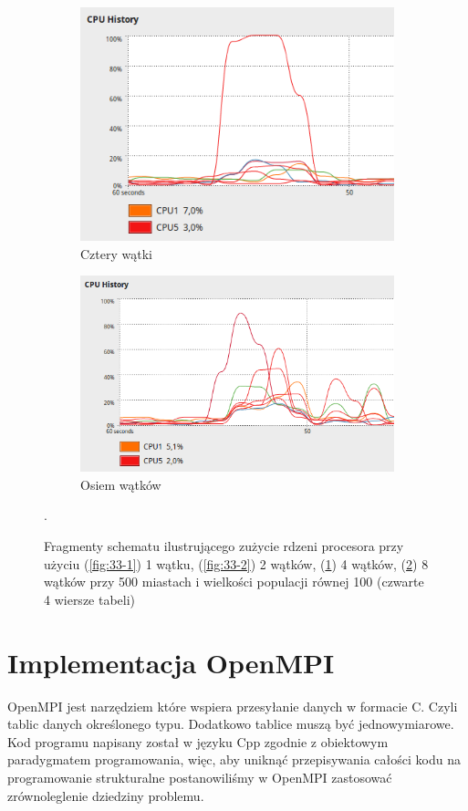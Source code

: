 \documentclass[10pt,a4paper]{article}
\begin{document}
\begin{figure}[H]
    \begin{subfigure}[b]{0.4\textwidth}
        \includegraphics[width=\textwidth]{33-4.png}
        \caption{Cztery wątki}
        \label{fig:33-4}
    \end{subfigure} 
    \begin{subfigure}[b]{0.4\textwidth}
            \includegraphics[width=\textwidth]{33-8.png}
            \caption{Osiem wątków}
            \label{fig:33-8}
    \end{subfigure}
    \caption{Fragmenty schematu ilustrującego zużycie rdzeni procesora przy użyciu (\ref{fig:33-1}) 1 wątku, (\ref{fig:33-2}) 2 wątków, (\ref{fig:33-4}) 4 wątków, (\ref{fig:33-8}) 8 wątków przy 500 miastach i wielkości populacji równej 100 (czwarte 4 wiersze tabeli)}\label{fig:33}. 
\end{figure}
\section{Implementacja OpenMPI}
 OpenMPI jest narzędziem które wspiera przesyłanie danych w formacie C. Czyli tablic danych określonego typu. Dodatkowo tablice muszą być jednowymiarowe. Kod programu napisany został w języku Cpp zgodnie z obiektowym paradygmatem programowania, więc, aby uniknąć przepisywania całości kodu na programowanie strukturalne postanowiliśmy w OpenMPI zastosować zrównoleglenie dziedziny problemu. 
\end{document}

